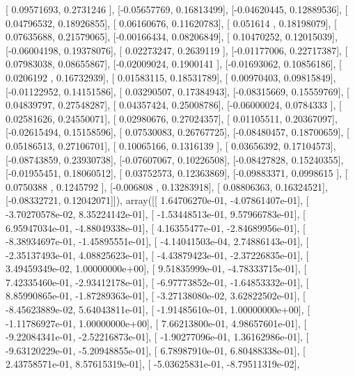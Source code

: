 \documentclass{article}
\begin{document}
       [ 0.09571693,  0.2731246 ],
       [-0.05657769,  0.16813499],
       [-0.04620445,  0.12889536],
       [ 0.04796532,  0.18926855],
       [ 0.06160676,  0.11620783],
       [ 0.051614  ,  0.18198079],
       [ 0.07635688,  0.21579065],
       [-0.00166434,  0.08206849],
       [ 0.10470252,  0.12015039],
       [-0.06004198,  0.19378076],
       [ 0.02273247,  0.2639119 ],
       [-0.01177006,  0.22717387],
       [ 0.07983038,  0.08655867],
       [-0.02009024,  0.1900141 ],
       [-0.01693062,  0.10856186],
       [ 0.0206192 ,  0.16732939],
       [ 0.01583115,  0.18531789],
       [ 0.00970403,  0.09815849],
       [-0.01122952,  0.14151586],
       [ 0.03290507,  0.17384943],
       [-0.08315669,  0.15559769],
       [ 0.04839797,  0.27548287],
       [ 0.04357424,  0.25008786],
       [-0.06000024,  0.0784333 ],
       [ 0.02581626,  0.24550071],
       [ 0.02980676,  0.27024357],
       [ 0.01105511,  0.20367097],
       [-0.02615494,  0.15158596],
       [ 0.07530083,  0.26767725],
       [-0.08480457,  0.18700659],
       [ 0.05186513,  0.27106701],
       [ 0.10065166,  0.1316139 ],
       [ 0.03656392,  0.17104573],
       [-0.08743859,  0.23930738],
       [-0.07607067,  0.10226508],
       [-0.08427828,  0.15240355],
       [-0.01955451,  0.18060512],
       [ 0.03752573,  0.12363869],
       [-0.09883371,  0.0998615 ],
       [ 0.0750388 ,  0.1245792 ],
       [-0.006808  ,  0.13283918],
       [ 0.08806363,  0.16324521],
       [-0.08332721,  0.12042071]]), array([[  1.64706270e-01,  -4.07861407e-01],
       [ -3.70270578e-02,   8.35224142e-01],
       [ -1.53448513e-01,   9.57966783e-01],
       [  6.95947034e-01,  -4.88049338e-01],
       [  4.16355477e-01,  -2.84689956e-01],
       [ -8.38934697e-01,  -1.45895551e-01],
       [ -4.14041503e-04,   2.74886143e-01],
       [ -2.35137493e-01,   4.08825623e-01],
       [ -4.43879423e-01,  -2.37226835e-01],
       [  3.49459349e-02,   1.00000000e+00],
       [  9.51835999e-01,  -4.78333715e-01],
       [  7.42335460e-01,  -2.93412178e-01],
       [ -6.97773852e-01,  -1.64853332e-01],
       [  8.85990865e-01,  -1.87289363e-01],
       [ -3.27138080e-02,   3.62822502e-01],
       [ -8.45623889e-02,   5.64043811e-01],
       [ -1.91485610e-01,   1.00000000e+00],
       [ -1.11786927e-01,   1.00000000e+00],
       [  7.66213800e-01,   4.98657601e-01],
       [ -9.22084341e-01,  -2.52216873e-01],
       [ -1.90277096e-01,   1.36162986e-01],
       [ -9.63120229e-01,  -5.20948855e-01],
       [  6.78987910e-01,   6.80488338e-01],
       [  2.43758571e-01,   8.57615319e-01],
       [ -5.03625831e-01,  -8.79511319e-02],
\end{document}
